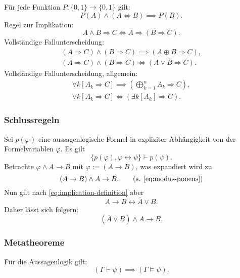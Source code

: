 Für jede Funktion $P\colon\{0,1\}\to\{0,1\}$ gilt:
\begin{equation}
P(A)\land (A\Leftrightarrow B)\implies P(B).
\end{equation}
Regel zur Implikation:
\begin{equation}
A\land B\Rightarrow C \iff A\Rightarrow (B\Rightarrow C).
\end{equation}
Vollständige Fallunterscheidung:
\begin{gather}
(A\Rightarrow C)\land (B\Rightarrow C)\implies (A\oplus B\Rightarrow C),\\
(A\Rightarrow C)\land (B\Rightarrow C)\iff (A\lor B\Rightarrow C).
\end{gather}
Vollständige Fallunterscheidung, allgemein:
\begin{gather}
\textstyle \forall k[A_k\Rightarrow C]
\implies (\bigoplus_{k=1}^n A_k\Rightarrow C),\\
\forall k[A_k\Rightarrow C]
\iff (\exists k[A_k]\Rightarrow C).
\end{gather}

\subsubsection{Schlussregeln}
 Sei $p(\varphi)$ eine aussagenlogische
Formel in expliziter Abhängigkeit von der Formelvariablen $\varphi$.
Es gilt
\begin{equation}
\{p(\varphi),\varphi\leftrightarrow\psi\}\vdash p(\psi).
\end{equation}
 Betrachte $\varphi\land A\rightarrow B$ mit
$\varphi:=(A\rightarrow B)$, was expandiert wird zu
\[(A\rightarrow B)\land A\rightarrow B.\qquad\text{(s. \eqref{eq:modus-ponens})}\]
Nun gilt nach \eqref{eq:implication-definition} aber
\[A\rightarrow B\leftrightarrow \overline A\lor B.\]
Daher lässt sich folgern:
\[(\overline A\lor B)\land A\rightarrow B.\]

\subsubsection{Metatheoreme}

Für die Aussagenlogik gilt:
\begin{equation}
(\Gamma\vdash\psi)\implies (\Gamma\models\psi).
\end{equation}

\noindent
{}

